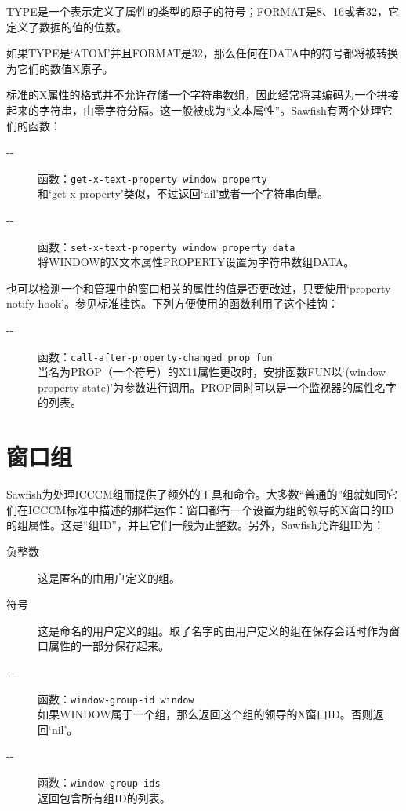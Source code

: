 \documentclass{book}
\begin{document}
\begin{CJK*}{UTF8}{gbsn}
\begin{description}
TYPE是一个表示定义了属性的类型的原子的符号；FORMAT是8、16或者32，它定义了数据的值的位数。

如果TYPE是`ATOM'并且FORMAT是32，那么任何在DATA中的符号都将被转换为它们的数值X原子。
\end{description}

标准的X属性的格式并不允许存储一个字符串数组，因此经常将其编码为一个拼接起来的字符串，由零字符分隔。这一般被成为``文本属性''。Sawfish有两个处理它们的函数：
\begin{description}
\item[-{}-] 函数：\verb|get-x-text-property window property|\\
和`get-x-property'类似，不过返回`nil'或者一个字符串向量。
\item[-{}-] 函数：\verb|set-x-text-property window property data|\\
将WINDOW的X文本属性PROPERTY设置为字符串数组DATA。
\end{description}

也可以检测一个和管理中的窗口相关的属性的值是否更改过，只要使用`property-notify-hook'。参见标准挂钩。下列方便使用的函数利用了这个挂钩：
\begin{description}
\item[-{}-] 函数：\verb|call-after-property-changed prop fun|\\
当名为PROP（一个符号）的X11属性更改时，安排函数FUN以`(window property state)'为参数进行调用。PROP同时可以是一个监视器的属性名字的列表。
\end{description}
\section{窗口组}
Sawfish为处理ICCCM组而提供了额外的工具和命令。大多数``普通的''组就如同它们在ICCCM标准中描述的那样运作：窗口都有一个设置为组的领导的X窗口的ID的组属性。这是``组ID''，并且它们一般为正整数。另外，Sawfish允许组ID为：
\begin{description}
\item[负整数] 这是匿名的由用户定义的组。
\item[符号] 这是命名的用户定义的组。取了名字的由用户定义的组在保存会话时作为窗口属性的一部分保存起来。
\end{description}
\begin{description}
\item[-{}-] 函数：\verb|window-group-id window|\\
如果WINDOW属于一个组，那么返回这个组的领导的X窗口ID。否则返回`nil'。
\item[-{}-] 函数：\verb|window-group-ids|\\
返回包含所有组ID的列表。
\end{description}


\end{CJK*}
\end{document}
